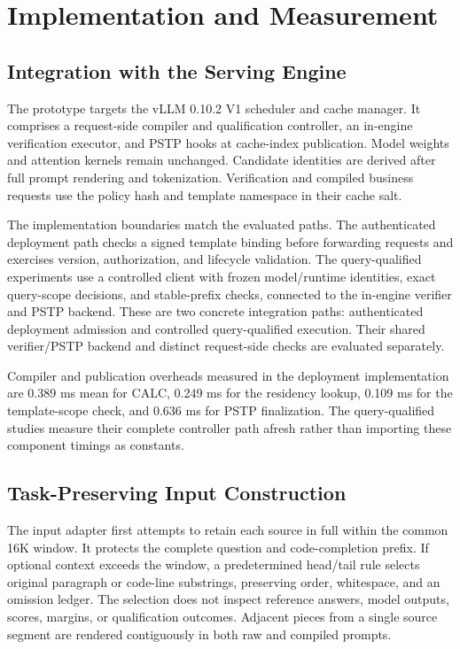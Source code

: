 \section{Implementation and Measurement}
\label{sec:implementation}

\subsection{Integration with the Serving Engine}
The prototype targets the vLLM 0.10.2 V1 scheduler and cache manager. It comprises a request-side compiler and qualification controller, an in-engine verification executor, and PSTP hooks at cache-index publication. Model weights and attention kernels remain unchanged. Candidate identities are derived after full prompt rendering and tokenization. Verification and compiled business requests use the policy hash and template namespace in their cache salt.

The implementation boundaries match the evaluated paths. The authenticated deployment path checks a signed template binding before forwarding requests and exercises version, authorization, and lifecycle validation. The query-qualified experiments use a controlled client with frozen model/runtime identities, exact query-scope decisions, and stable-prefix checks, connected to the in-engine verifier and PSTP backend. These are two concrete integration paths: authenticated deployment admission and controlled query-qualified execution. Their shared verifier/PSTP backend and distinct request-side checks are evaluated separately.

Compiler and publication overheads measured in the deployment implementation are 0.389 ms mean for CALC, 0.249 ms for the residency lookup, 0.109 ms for the template-scope check, and 0.636 ms for PSTP finalization. The query-qualified studies measure their complete controller path afresh rather than importing these component timings as constants.

\subsection{Task-Preserving Input Construction}
The input adapter first attempts to retain each source in full within the common 16K window. It protects the complete question and code-completion prefix. If optional context exceeds the window, a predetermined head/tail rule selects original paragraph or code-line substrings, preserving order, whitespace, and an omission ledger. The selection does not inspect reference answers, model outputs, scores, margins, or qualification outcomes. Adjacent pieces from a single source segment are rendered contiguously in both raw and compiled prompts.

